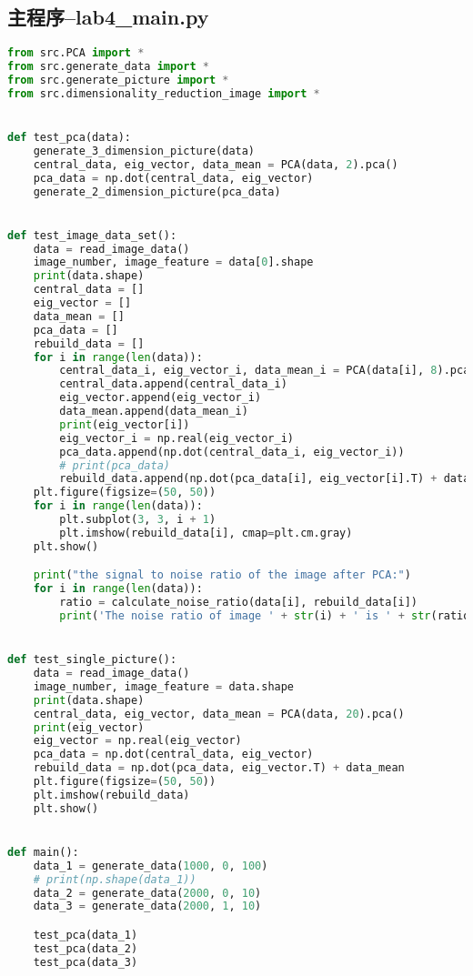 \documentclass{hitreport}
\begin{document}
\begin{appendices}
\section{主程序--lab4\_main.py}\label{app:data}
\begin{lstlisting}[language=python]
from src.PCA import *
from src.generate_data import *
from src.generate_picture import *
from src.dimensionality_reduction_image import *


def test_pca(data):
    generate_3_dimension_picture(data)
    central_data, eig_vector, data_mean = PCA(data, 2).pca()
    pca_data = np.dot(central_data, eig_vector)
    generate_2_dimension_picture(pca_data)


def test_image_data_set():
    data = read_image_data()
    image_number, image_feature = data[0].shape
    print(data.shape)
    central_data = []
    eig_vector = []
    data_mean = []
    pca_data = []
    rebuild_data = []
    for i in range(len(data)):
        central_data_i, eig_vector_i, data_mean_i = PCA(data[i], 8).pca()
        central_data.append(central_data_i)
        eig_vector.append(eig_vector_i)
        data_mean.append(data_mean_i)
        print(eig_vector[i])
        eig_vector_i = np.real(eig_vector_i)
        pca_data.append(np.dot(central_data_i, eig_vector_i))
        # print(pca_data)
        rebuild_data.append(np.dot(pca_data[i], eig_vector[i].T) + data_mean[i])
    plt.figure(figsize=(50, 50))
    for i in range(len(data)):
        plt.subplot(3, 3, i + 1)
        plt.imshow(rebuild_data[i], cmap=plt.cm.gray)
    plt.show()

    print("the signal to noise ratio of the image after PCA:")
    for i in range(len(data)):
        ratio = calculate_noise_ratio(data[i], rebuild_data[i])
        print('The noise ratio of image ' + str(i) + ' is ' + str(ratio))


def test_single_picture():
    data = read_image_data()
    image_number, image_feature = data.shape
    print(data.shape)
    central_data, eig_vector, data_mean = PCA(data, 20).pca()
    print(eig_vector)
    eig_vector = np.real(eig_vector)
    pca_data = np.dot(central_data, eig_vector)
    rebuild_data = np.dot(pca_data, eig_vector.T) + data_mean
    plt.figure(figsize=(50, 50))
    plt.imshow(rebuild_data)
    plt.show()


def main():
    data_1 = generate_data(1000, 0, 100)
    # print(np.shape(data_1))
    data_2 = generate_data(2000, 0, 10)
    data_3 = generate_data(2000, 1, 10)

    test_pca(data_1)
    test_pca(data_2)
    test_pca(data_3)


\end{lstlisting}
\end{appendices}
\end{document}
